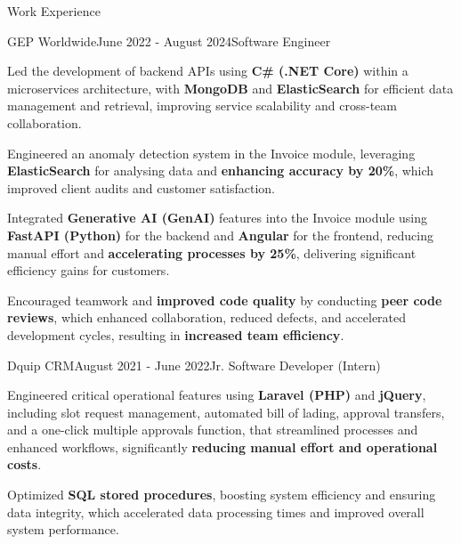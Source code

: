 \documentclass{resume} %
\begin{document}
	\begin{rSection}{Work Experience}
		\begin{rSubsection}{GEP Worldwide}{June 2022 - August 2024}{Software Engineer}
			\item Led the development of backend APIs using {\bf C\# (.NET Core)} within a microservices architecture, with {\bf MongoDB} and {\bf ElasticSearch} for efficient data management and retrieval, improving service scalability and cross-team collaboration.
			\item Engineered an anomaly detection system in the Invoice module, leveraging {\bf ElasticSearch} for analysing data and {\bf enhancing accuracy by 20\%}, which improved client audits and customer satisfaction.
			\item Integrated {\bf Generative AI (GenAI)} features into the Invoice module using {\bf FastAPI (Python)} for the backend and {\bf Angular} for the frontend, reducing manual effort and {\bf accelerating processes by 25\%}, delivering significant efficiency gains for customers.
			\item Encouraged teamwork and {\bf improved code quality} by conducting {\bf peer code reviews}, which enhanced collaboration, reduced defects, and accelerated development cycles, resulting in {\bf increased team efficiency}.
		\end{rSubsection}
		\begin{rSubsection}{Dquip CRM}{August 2021 - June 2022}{Jr. Software Developer (Intern)}
			\item Engineered critical operational features using {\bf Laravel (PHP)} and {\bf jQuery}, including slot request management, automated bill of lading, approval transfers, and a one-click multiple approvals function, that streamlined processes and enhanced workflows, significantly {\bf reducing manual effort and operational costs}.
			\item Optimized {\bf SQL stored procedures}, boosting system efficiency and ensuring data integrity, which accelerated data processing times and improved overall system performance.
		\end{rSubsection}
	\end{rSection}
	
\end{document}
